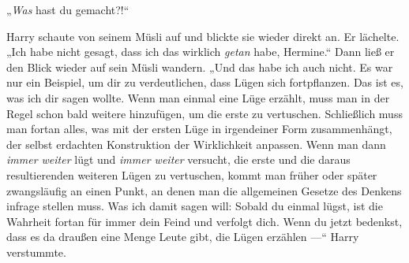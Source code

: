 „\emph{Was} hast du gemacht?!“

Harry schaute von seinem Müsli auf und blickte sie wieder direkt an. Er lächelte.
„Ich habe nicht gesagt, dass ich das wirklich \emph{getan} habe, Hermine.“ Dann ließ er den Blick wieder auf sein Müsli wandern.
„Und das habe ich auch nicht. Es war nur ein Beispiel, um dir zu verdeutlichen, dass Lügen sich fortpflanzen. Das ist es, was ich dir sagen wollte. Wenn man einmal eine Lüge erzählt, muss man in der Regel schon bald weitere hinzufügen, um die erste zu vertuschen. Schließlich muss man fortan alles, was mit der ersten Lüge in irgendeiner Form zusammenhängt, der selbst erdachten Konstruktion der Wirklichkeit anpassen. Wenn man dann \emph{immer weiter} lügt und \emph{immer weiter} versucht, die erste und die daraus resultierenden weiteren Lügen zu vertuschen, kommt man früher oder später zwangsläufig an einen Punkt, an denen man die allgemeinen Gesetze des Denkens infrage stellen muss. Was ich damit sagen will: Sobald du einmal lügst, ist die Wahrheit fortan für immer dein Feind und verfolgt dich. Wenn du jetzt bedenkst, dass es da draußen eine Menge Leute gibt, die Lügen erzählen —“ Harry verstummte.

